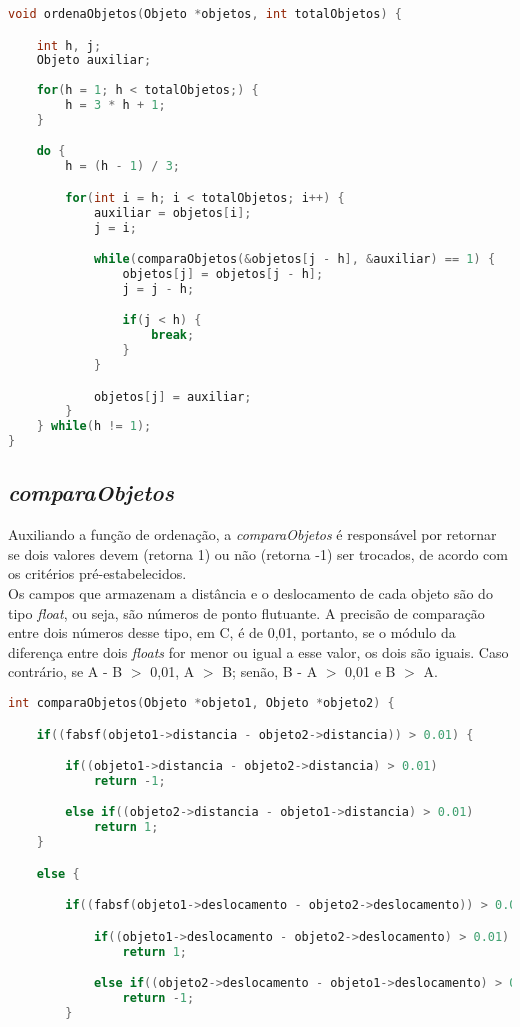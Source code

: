 \documentclass{article}
\begin{document}
\begin{lstlisting}[label={lst:cod1},language=C]
void ordenaObjetos(Objeto *objetos, int totalObjetos) {

    int h, j;
    Objeto auxiliar;
	
    for(h = 1; h < totalObjetos;) {
        h = 3 * h + 1;
    }

    do {
        h = (h - 1) / 3;

        for(int i = h; i < totalObjetos; i++) {
            auxiliar = objetos[i];
            j = i;

            while(comparaObjetos(&objetos[j - h], &auxiliar) == 1) {
                objetos[j] = objetos[j - h];
                j = j - h;

                if(j < h) {
                    break;
                }
            }

            objetos[j] = auxiliar;
        }
    } while(h != 1);
}
\end{lstlisting}


\subsection{\textit{comparaObjetos}}

\hspace*{\parindent}Auxiliando a função de ordenação, a \textit{comparaObjetos} é responsável por retornar se dois valores devem (retorna 1) ou não (retorna -1) ser trocados, de acordo com os critérios pré-estabelecidos.\\
\hspace*{\parindent}Os campos que armazenam a distância e o deslocamento de cada objeto são do tipo \textit{float}, ou seja, são números de ponto flutuante. A precisão de comparação entre dois números desse tipo, em C, é de 0,01, portanto, se o módulo da diferença entre dois \textit{floats} for menor ou igual a esse valor, os dois são iguais. Caso contrário, se A - B $>$ 0,01, A $>$ B; senão, B - A $>$ 0,01 e B $>$ A.

\begin{lstlisting}[label={lst:cod1},language=C]
int comparaObjetos(Objeto *objeto1, Objeto *objeto2) {

    if((fabsf(objeto1->distancia - objeto2->distancia)) > 0.01) {

        if((objeto1->distancia - objeto2->distancia) > 0.01)
            return -1;

        else if((objeto2->distancia - objeto1->distancia) > 0.01)
            return 1;
    }

    else {

        if((fabsf(objeto1->deslocamento - objeto2->deslocamento)) > 0.01) {

            if((objeto1->deslocamento - objeto2->deslocamento) > 0.01)
                return 1;

            else if((objeto2->deslocamento - objeto1->deslocamento) > 0.01)
                return -1;
        }    
\end{lstlisting}
\end{document}
